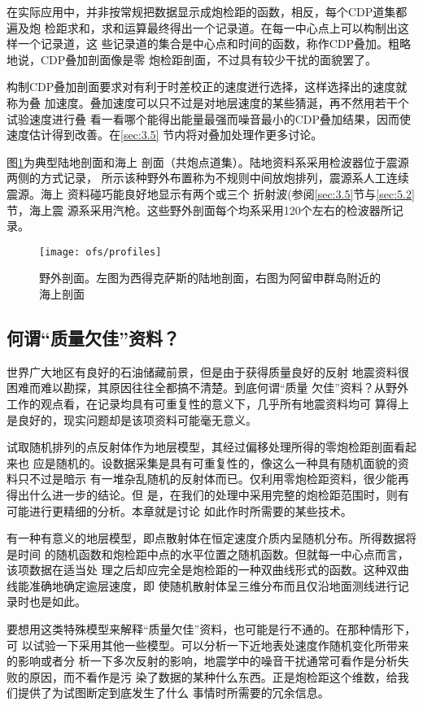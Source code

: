 在实际应用中，并非按常规把数据显示成炮检距的函数，相反，每个CDP道集都遍及炮
检距求和，求和运算最终得出一个记录道。在每一中心点上可以构制出这样一个记录道，这
些记录道的集合是中心点和时间的函数，称作CDP叠加。粗略地说，CDP叠加剖面像是零
炮检距剖面，不过具有较少干扰的面貌罢了。

构制CDP叠加剖面要求对有利于时差校正的速度迸行选择，这样选择出的速度就称为叠
加速度。叠加速度可以只不过是对地层速度的某些猜涎，再不然用若干个试验速度进行叠
看一看哪个能得出能量最强而噪音最小的CDP叠加结果，因而使速度估计得到改善。在\ref{sec:3.5}
节内将对叠加处理作更多讨论。

图\ref{fig:ofs/profiles}为典型陆地剖面和海上
剖面（共炮点道集）。陆地资料系采用检波器位于震源两侧的方式记录，
所示该种野外布置称为不规则中间放炮排列，震源系人工连续震源。海上
资料碰巧能良好地显示有两个或三个
折射波(参阅\ref{sec:3.5}节与\ref{sec:5.2}节，海上震
源系采用汽枪。这些野外剖面每个均系采用120个左右的检波器所记录。
\begin{figure}[H]
\centering
\texttt{[image: ofs/profiles]}
\caption[profiles]{野外剖面。左图为西得克萨斯的陆地剖面，右图为阿留申群岛附近的海上剖面}
\label{fig:ofs/profiles}
\end{figure}

\subsection{何谓“质量欠佳”资料？}
\label{sec:3.0.2}

世界广大地区有良好的石油储藏前景，但是由于获得质量良好的反射
地震资料很困难而难以勘探，其原因往往全都搞不清楚。到底何谓“质量
欠佳”资料？从野外工作的观点看，在记录均具有可重复性的意义下，几乎所有地震资料均可
算得上是良好的，现实问题却是该项资料可能毫无意义。

试取随机排列的点反射体作为地层模型，其经过偏移处理所得的零炮检距剖面看起来也
应是随机的。设数据采集是具有可重复性的，像这么一种具有随机面貌的资料只不过是暗示
有一堆杂乱随机的反射体而已。仅利用零炮检距资料，很少能再得出什么进一步的结论。但
是，在我们的处理中采用完整的炮检距范围时，则有可能进行更精细的分析。本章就是讨论
如此作时所需要的某些技术。

有一种有意义的地层模型，即点散射体在恒定速度介质内呈随机分布。所得数据将是时间
的随机函数和炮检距中点的水平位置之随机函数。但就每一中心点而言，该项数据在适当处
理之后却应完全是炮检距的一种双曲线形式的函数。这种双曲线能准确地确定逾层速度，即
使随机散射体呈三维分布而且仅沿地面测线进行记录时也是如此。

要想用这类特殊模型来解释“质量欠佳”资料，也可能是行不通的。在那种情形下，可
以试验一下采用其他一些模型。可以分析一下近地表处速度作随机变化所带来的影响或者分
析一下多次反射的影响，地震学中的噪音干扰通常可看作是分析失败的原因，而不看作是污
染了数据的某种什么东西。正是炮检距这个维数，给我们提供了为试图断定到底发生了什么
事情时所需要的冗余信息。

